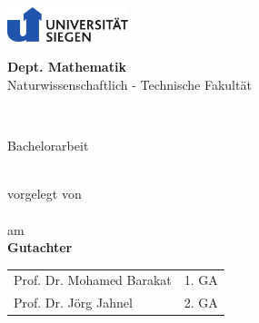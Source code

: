 {\raggedleft\includegraphics[height=1cm]{assets/logo.pdf}\par}
\makeatletter
\begin{center}
  \textbf{Dept. Mathematik}\\
   Naturwissenschaftlich - Technische Fakult\"at\\
   
  \vspace{5cm}
  \begin{Large}
    \textbf{\@title}
  \end{Large}\\
  
  \vspace{2.5cm}
  \begin{large}
    Bachelorarbeit
  \end{large}\\
  vorgelegt von\\
  \@author\\
  am \@date\\
  \vspace{3.5cm}
  \textbf{Gutachter}\\
  \medskip
  \begin{tabular}{lr}
    Prof. Dr. Mohamed Barakat & 1. GA \\
    Prof. Dr. Jörg Jahnel & 2. GA \\
  \end{tabular}
\end{center}
\makeatother
